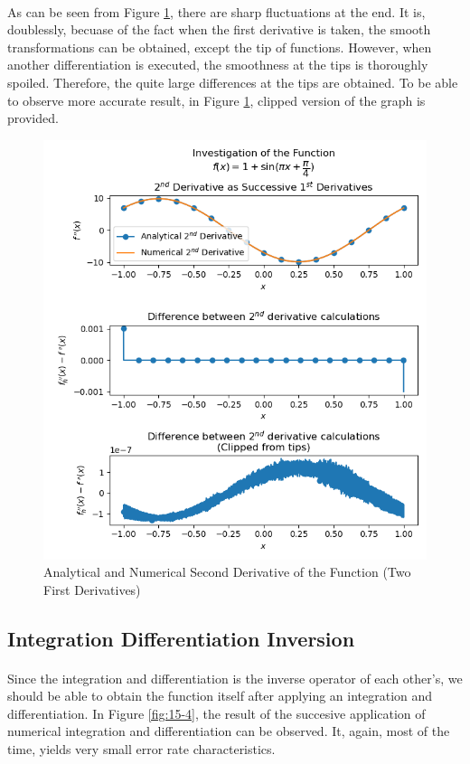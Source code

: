 \documentclass[letterpaper,12pt]{article}
\begin{document}
\paragraph{} As can be seen from Figure \ref{fig:15-3}, there are sharp fluctuations at the end. It is, doublessly, becuase of the fact when the first derivative is taken, the smooth transformations can be obtained, except the tip of functions. However, when another differentiation is executed, the smoothness at the tips is thoroughly spoiled. Therefore, the quite large differences at the tips are obtained. To be able to observe more accurate result, in Figure \ref{fig:15-3}, clipped version of the graph is provided.  
\begin{figure}[H]
\centerline{\includegraphics[width=\linewidth]{figures/15-3.png}}
\caption{Analytical and Numerical Second Derivative of the Function (Two First Derivatives)}
\label{fig:15-3}
\end{figure}


\label{sec:twofirstderiv}
\subsection{Integration Differentiation Inversion}
\paragraph{} Since the integration and differentiation is the inverse operator of each other's, we should be able to obtain the function itself after applying an integration and differentiation.  In Figure \ref{fig:15-4}, the result of the succesive application of numerical integration and differentiation can be observed. It, again, most of the time, yields very small error rate characteristics.
\end{document}
